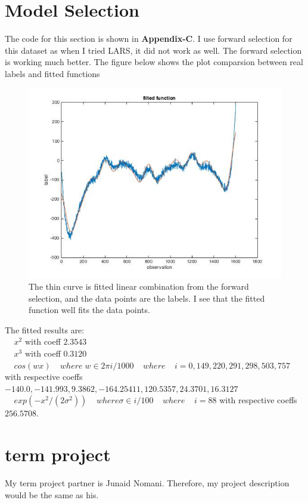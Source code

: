 \documentclass[twoside]{article}
\theoremstyle{definition}
\theoremstyle{definition}
\theoremstyle{remark}
\begin{document}
\section{Model Selection}
The code for this section is shown in \textbf{Appendix-C}. I use forward selection for this dataset as when I tried LARS, it did not work as well. The forward selection is working much better. The figure below shows the plot comparsion between real labels and fitted functions 
\begin{figure}[H]
\centering
\includegraphics[width=120mm]{problem3_1.jpg}
\caption{The thin curve is fitted linear combination from the forward selection, and the data points are the labels. I see that the fitted function well fits the data points.}
\end{figure}
The fitted results are:\\ 
$\;\;\;\; x^2$ with coeff $2.3543$\\
$\;\;\;\; x^3$ with coeff $0.3120$\\
$\;\;\;\; cos(wx) \;\;\;\; where \; w \in {2\pi i /1000}\;\;\;\; where \;\;\;\; i = {0, 149, 220, 291, 298, 503, 757}$ with respective coeffs $ {-140.0, -141.993, 9.3862, -164.25411, 120.5357, 24.3701, 16.3127}$\\
$\;\;\;\; exp(-x^2/(2\sigma^2)) \;\;\;\; where \sigma \in {i/100} \;\;\;\; where\;\;\;\; i = 88$ with respective coeffs $256.5708$.

\section{term project}
My term project partner is Junaid Nomani. Therefore, my project description would be the same as his. 
\end{document}
